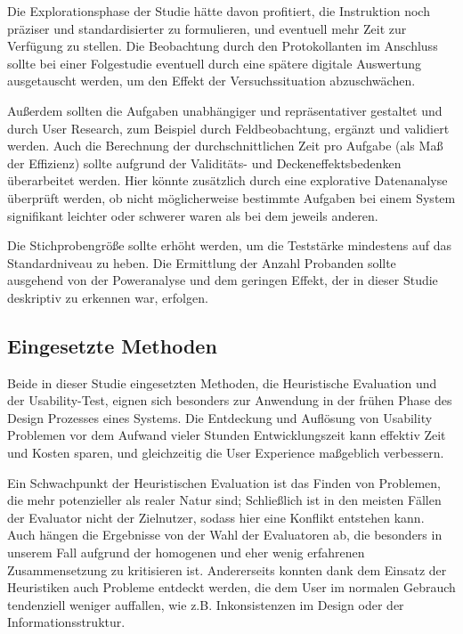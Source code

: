 Die Explorationsphase der Studie hätte davon profitiert, die Instruktion noch präziser und standardisierter zu formulieren, und eventuell mehr Zeit zur Verfügung zu stellen. 
Die Beobachtung durch den Protokollanten im Anschluss sollte bei einer Folgestudie eventuell durch eine spätere digitale Auswertung ausgetauscht werden, um den Effekt der Versuchssituation abzuschwächen.

Außerdem sollten die Aufgaben unabhängiger und repräsentativer gestaltet und durch User Research, zum Beispiel durch Feldbeobachtung, ergänzt und validiert werden. Auch die Berechnung der durchschnittlichen Zeit pro Aufgabe (als Maß der Effizienz) sollte aufgrund der Validitäts- und Deckeneffektsbedenken überarbeitet werden. Hier könnte zusätzlich durch eine explorative Datenanalyse überprüft werden, ob nicht möglicherweise bestimmte Aufgaben bei einem System signifikant leichter oder schwerer waren als bei dem jeweils anderen.

Die Stichprobengröße sollte erhöht werden, um die Teststärke mindestens auf das Standardniveau zu heben. Die Ermittlung der Anzahl Probanden sollte ausgehend von der Poweranalyse und dem geringen Effekt, der in dieser Studie deskriptiv zu erkennen war, erfolgen.




\subsection{Eingesetzte Methoden}
Beide in dieser Studie eingesetzten Methoden, die Heuristische Evaluation und der Usability-Test, eignen sich besonders zur Anwendung in der frühen Phase des Design Prozesses eines Systems. Die Entdeckung und Auflösung von Usability Problemen vor dem Aufwand vieler Stunden Entwicklungszeit kann effektiv Zeit und Kosten sparen, und gleichzeitig die User Experience maßgeblich verbessern. 

Ein Schwachpunkt der Heuristischen Evaluation ist das Finden von Problemen, die mehr potenzieller als realer Natur sind; Schließlich ist in den meisten Fällen der Evaluator nicht der Zielnutzer, sodass hier eine Konflikt entstehen kann. Auch hängen die Ergebnisse von der Wahl der Evaluatoren ab, die besonders in unserem Fall aufgrund der homogenen und eher wenig erfahrenen Zusammensetzung zu kritisieren ist.
Andererseits konnten dank dem Einsatz der Heuristiken auch Probleme entdeckt werden, die dem User im normalen Gebrauch tendenziell weniger auffallen, wie z.B. Inkonsistenzen im Design oder der Informationsstruktur.

